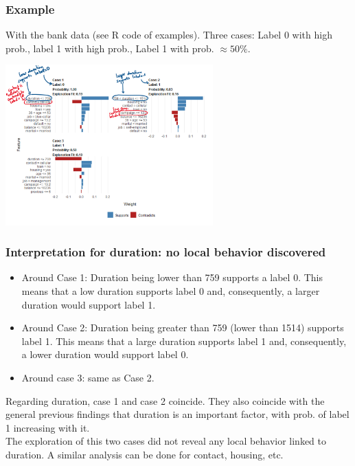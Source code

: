 \begin{frame}
\frametitle{Example}
With the bank data (see R code of examples). Three cases: Label 0 with high prob., label 1 with high prob., Label 1 with prob. $\approx 50\%$.
\begin{center}
\includegraphics[width=8cm]{../Graphs/LIME_interpret.png}
\end{center}
\end{frame}
\begin{frame}
\frametitle{Interpretation for duration: no local behavior discovered}
\begin{itemize}
\item Around Case 1: Duration being lower than 759 supports a label 0. This means that a low duration supports label 0 and, consequently, a larger duration would support label 1. 
\item Around Case 2: Duration being greater than 759 (lower than 1514) supports label 1. This means that a large duration supports label 1 and, consequently, a lower duration would support label 0.
\item Around case 3: same as Case 2.
\end{itemize}
Regarding duration, case 1 and case 2 coincide. They also coincide with the general previous findings that duration is an important factor, with prob. of label 1 increasing with it.\\
\vspace{0.2cm}
The exploration of this two cases did not reveal any local behavior linked to duration. A similar analysis can be done for contact, housing, etc. 
\end{frame}
